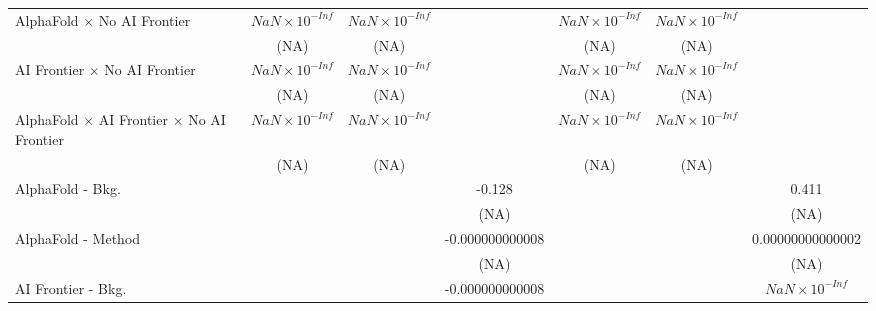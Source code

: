 \begin{tabular}{lcccccc}
   AlphaFold $\times$ No AI Frontier                                          & $NaN\times 10^{-Inf}$  & $NaN\times 10^{-Inf}$  &                        & $NaN\times 10^{-Inf}$  & $NaN\times 10^{-Inf}$  &   \\   
                                                                              & (NA)                   & (NA)                   &                        & (NA)                   & (NA)                   &   \\   
   AI Frontier $\times$ No AI Frontier                                        & $NaN\times 10^{-Inf}$  & $NaN\times 10^{-Inf}$  &                        & $NaN\times 10^{-Inf}$  & $NaN\times 10^{-Inf}$  &   \\   
                                                                              & (NA)                   & (NA)                   &                        & (NA)                   & (NA)                   &   \\   
   AlphaFold $\times$ AI Frontier $\times$ No AI Frontier                     & $NaN\times 10^{-Inf}$  & $NaN\times 10^{-Inf}$  &                        & $NaN\times 10^{-Inf}$  & $NaN\times 10^{-Inf}$  &   \\   
                                                                              & (NA)                   & (NA)                   &                        & (NA)                   & (NA)                   &   \\   
   AlphaFold - Bkg.                                                           &                        &                        & -0.128                 &                        &                        & 0.411\\   
                                                                              &                        &                        & (NA)                   &                        &                        & (NA)\\   
   AlphaFold - Method                                                         &                        &                        & -0.000000000008        &                        &                        & 0.00000000000002\\   
                                                                              &                        &                        & (NA)                   &                        &                        & (NA)\\   
   AI Frontier - Bkg.                                                         &                        &                        & -0.000000000008        &                        &                        & $NaN\times 10^{-Inf}$\\    

\end{tabular}
